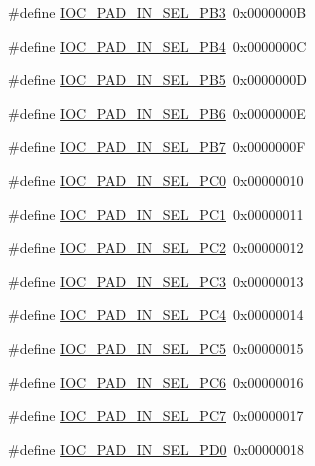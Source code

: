 \begin{DoxyCompactItemize}
\item 
\#define \hyperlink{group__ioc__api_ga7e17e23c7ddd14dc6f75efd801512be1}{I\+O\+C\+\_\+\+P\+A\+D\+\_\+\+I\+N\+\_\+\+S\+E\+L\+\_\+\+P\+B3}~0x0000000B
\item 
\#define \hyperlink{group__ioc__api_ga81a0a1663cab5b896204db538e849aa6}{I\+O\+C\+\_\+\+P\+A\+D\+\_\+\+I\+N\+\_\+\+S\+E\+L\+\_\+\+P\+B4}~0x0000000C
\item 
\#define \hyperlink{group__ioc__api_ga453360a0dfa430c65ee4186facf4899c}{I\+O\+C\+\_\+\+P\+A\+D\+\_\+\+I\+N\+\_\+\+S\+E\+L\+\_\+\+P\+B5}~0x0000000D
\item 
\#define \hyperlink{group__ioc__api_ga1936b0a24e93bf593bbe6d346a362b9e}{I\+O\+C\+\_\+\+P\+A\+D\+\_\+\+I\+N\+\_\+\+S\+E\+L\+\_\+\+P\+B6}~0x0000000E
\item 
\#define \hyperlink{group__ioc__api_gab89bed1e8b5ca38a107d47871a51ce8c}{I\+O\+C\+\_\+\+P\+A\+D\+\_\+\+I\+N\+\_\+\+S\+E\+L\+\_\+\+P\+B7}~0x0000000F
\item 
\#define \hyperlink{group__ioc__api_ga04cce3ad317b54422c8ed689e0d38d7f}{I\+O\+C\+\_\+\+P\+A\+D\+\_\+\+I\+N\+\_\+\+S\+E\+L\+\_\+\+P\+C0}~0x00000010
\item 
\#define \hyperlink{group__ioc__api_ga64c0b65aa571281a0aa029dd101779e0}{I\+O\+C\+\_\+\+P\+A\+D\+\_\+\+I\+N\+\_\+\+S\+E\+L\+\_\+\+P\+C1}~0x00000011
\item 
\#define \hyperlink{group__ioc__api_ga4695471be6b454697aef79e92588a49e}{I\+O\+C\+\_\+\+P\+A\+D\+\_\+\+I\+N\+\_\+\+S\+E\+L\+\_\+\+P\+C2}~0x00000012
\item 
\#define \hyperlink{group__ioc__api_ga243c10be27ff40607aaef241a7a0946d}{I\+O\+C\+\_\+\+P\+A\+D\+\_\+\+I\+N\+\_\+\+S\+E\+L\+\_\+\+P\+C3}~0x00000013
\item 
\#define \hyperlink{group__ioc__api_ga0afc2cf588c9b0eb23a761da5fb4c416}{I\+O\+C\+\_\+\+P\+A\+D\+\_\+\+I\+N\+\_\+\+S\+E\+L\+\_\+\+P\+C4}~0x00000014
\item 
\#define \hyperlink{group__ioc__api_ga7bdb0a6b28799db1f0b97056d72ffbbe}{I\+O\+C\+\_\+\+P\+A\+D\+\_\+\+I\+N\+\_\+\+S\+E\+L\+\_\+\+P\+C5}~0x00000015
\item 
\#define \hyperlink{group__ioc__api_gaf77e2ef01a5e6920029a12681136a74f}{I\+O\+C\+\_\+\+P\+A\+D\+\_\+\+I\+N\+\_\+\+S\+E\+L\+\_\+\+P\+C6}~0x00000016
\item 
\#define \hyperlink{group__ioc__api_gaf8c24e140a910194afa870bcf743dc75}{I\+O\+C\+\_\+\+P\+A\+D\+\_\+\+I\+N\+\_\+\+S\+E\+L\+\_\+\+P\+C7}~0x00000017
\item 
\#define \hyperlink{group__ioc__api_ga718bc3d140c1203e4530a070d95cce21}{I\+O\+C\+\_\+\+P\+A\+D\+\_\+\+I\+N\+\_\+\+S\+E\+L\+\_\+\+P\+D0}~0x00000018

\end{DoxyCompactItemize}
